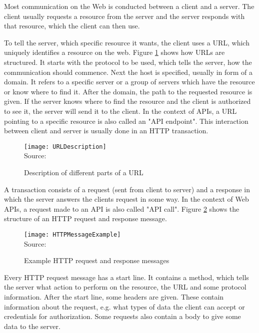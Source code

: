 Most communication on the Web is conducted between a client and a server. The client usually
requests a resource from the server and the server responds with that resource, which the client
can then use\cite[4]{gourley2002http}.


To tell the server, which specific resource it wants, the client uses a \ac{URL}, which 
uniquely identifies a resource on the web. 
Figure \ref{fig:Description of different parts of a URL} shows how URLs are structured.
It starts with the protocol to be used, which tells the server, how the communication should commence.
Next the host is specified, usually in form of a domain. It refers to a specific
server or a group of servers which have the resource or know where to find it.
After the domain, the path to the requested resource is given.\cite[6f., 24]{gourley2002http}
If the server knows where to find the resource and the client is authorized to see it,
the server will send it to the client.
In the context of APIs, a URL pointing to a specific resource is also called an "API endpoint".\cite{Cooksey2014}
This interaction between client and server is usually done in an HTTP transaction.

\begin{figure}[H]
    \caption{Description of different parts of a URL}
	\label{fig:Description of different parts of a URL}
    \texttt{[image: URLDescription]}
    \\
    Source: \cite[24]{gourley2002http}
\end{figure}

A transaction consists of a request (sent from client to server) and a response in which the
server answers the clients request in some way.\cite[8]{gourley2002http}
In the context of Web APIs, a request made to an API is also called "API call".\cite{StoplightAPITypes}
Figure \ref{fig:Example HTTP request and response messages} shows the structure of an 
HTTP request and response message.

\begin{figure}[H]
    \caption{Example HTTP request and response messages}
	\label{fig:Example HTTP request and response messages}
    \texttt{[image: HTTPMessageExample]}
    \\
    Source: \cite[47]{gourley2002http}
\end{figure}

Every HTTP request message has a start line.
It contains a method, which tells the server what action to perform on the resource, the URL
and some protocol information.\cite[47]{gourley2002http}
After the start line, some headers are given. These contain information about the request,
e.g. what types of data the client can accept or credentials for authorization.
Some requests also contain a body to give some data to the server. \cite[52]{gourley2002http}

